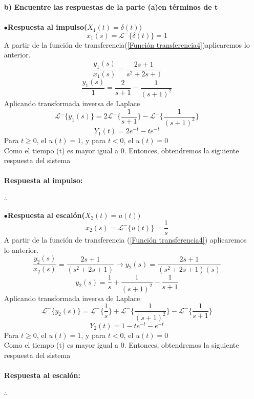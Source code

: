 \documentclass[11pt,a4paper]{article}
\begin{document}
{{\begin{enumerate}
	\item[\textbf{b)}]
	\textbf{Encuentre las respuestas de la parte (a)en términos de t}\\\\
	$\bullet$\textbf{Respuesta al impulso($X_1(t)=\delta (t))$}\\
	$$x_1(s)=\mathcal{L^{-}}{\lbrace \delta (t) \rbrace}=1$$
	A partir de la función de transferencia(\ref{Función transferencia4})aplicaremos lo anterior.
	$$\dfrac{y_1(s)}{x_1(s)}=\dfrac{2s+1}{s^2 +2s+1}$$
	$$\dfrac{y_1(s)}{1}=\dfrac{2}{s+1}-\dfrac{1}{(s+1)^2}$$
	Aplicando transformada inversa de Laplace
	$$\mathcal{L^{-}}{\lbrace y_1(s)\rbrace }=2 \mathcal{L^{-}}{\lbrace \dfrac{1}{s+1} \rbrace } -\mathcal{L^{-}}{\lbrace \dfrac{1}{(s+1)^2}\rbrace}$$
	$$Y_1(t)=2e^{-t}-te^{-t}$$
	Para $t \geq 0$, el $u(t)=1$, y para  $t < 0$, el $u(t)=0$\\
	Como el tiempo (t) es  mayor igual a 0. Entonces, obtendremos la siguiente respuesta del sistema\\\\
	\textbf{Respuesta al impulso:}
	\begin{center}
	$\therefore$ 
	\end{center}
	
	$\bullet$\textbf{Respuesta al escalón($X_2(t)= u(t))$}\\
	$$x_2(s)=\mathcal{L^{-}}{\lbrace u(t) \rbrace}= \dfrac{1}{s}$$
	A partir de la función de transferencia (\ref{Función transferencia4}) aplicaremos lo anterior.
	$$\dfrac{y_2(s)}{x_2(s)}= \dfrac{2s+1}{(s^2 +2s+1)} \rightarrow  y_2(s)= \dfrac{2s+1}{(s^2 +2s+1)(s)}$$
	$$ y_2(s)= \dfrac{1}{s}+ \dfrac{1}{(s+1)^2}- \dfrac{1}{s+1}$$
	Aplicando transformada inversa de Laplace
	$$\mathcal{L^{-}}{\lbrace y_2(s)\rbrace }= \mathcal{L^{-}}{\lbrace \dfrac{1}{s} \rbrace } +\mathcal{L^{-}}{\lbrace \dfrac{1}{(s+1)^2}\rbrace}-\mathcal{L^{-}}{\lbrace \dfrac{1}{s+1} \rbrace } $$
	$$Y_2(t)=1-te^{-t}-e^{-t}$$
	Para $t \geq 0$, el $u(t)=1$, y para  $t < 0$, el $u(t)=0$\\
	Como el tiempo (t) es  mayor igual a 0. Entonces, obtendremos la siguiente respuesta del sistema\\\\
	\textbf{Respuesta al escalón:}
	\begin{center}
	$\therefore$ 
	\end{center}
	

\end{enumerate}}}
\end{document}
